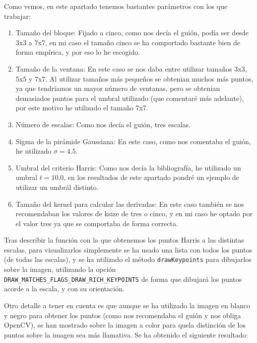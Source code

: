 \documentclass[12pt, spanish]{article}
\begin{document}
Como vemos, en este apartado tenemos bastantes parámetros con los que trabajar:

\begin{enumerate}
	\item Tamaño del bloque: Fijado a cinco, como nos decía el guión, podía ser desde 3x3 a 7x7, en mi caso el tamaño cinco se ha comportado bastante bien de forma empírica, y por eso lo he escogido.
	\item Tamaño de la ventana: En este caso se nos daba entre utilizar tamaños 3x3, 5x5 y 7x7. Al utilizar tamaños más pequeños se obtenian muchos más puntos, ya que tendríamos un mayor número de ventanas, pero se obtenian demasiados puntos para el umbral utilizado (que comentaré más adelante), por este motivo he utilizado el tamaño 7x7.
	\item Número de escalas: Como nos decía el guión, tres escalas.
	\item Sigma de la pirámide Gaussiana: En este caso, como nos comentaba el guión, he utilizado $\sigma = 4.5$.
	\item Umbral del criterio Harris: Como nos decía la bibliografía\cite{harris}, he utilizado un umbral $t = 10.0$, en los resultados de este apartado pondré un ejemplo de utilizar un umbrál distinto.
	\item Tamaño del kernel para calcular las derivadas: En este caso también se nos recomendaban los valores de ksize de tres o cinco, y en mi caso he optado por el valor tres ya que se comportaba de forma correcta.
\end{enumerate}

Tras describir la función con la que obtenemos los puntos Harris a las distintas escalas, para visualizarlos simplemente se ha usado una lista con todos los puntos (de todas las escalas), y se ha utilizado el método \texttt{drawKeypoints} para dibujarlos sobre la imagen, utilizando la opción\\  \texttt{DRAW\_MATCHES\_FLAGS\_DRAW\_RICH\_KEYPOINTS} de forma que dibujará los puntos acorde a la escala, y con su orientación.

Otro detalle a tener en cuenta es que aunque se ha utilizado la imagen en blanco y negro para obtener los puntos (como nos recomendaba el guión y nos obliga OpenCV), se han mostrado sobre la imagen a color para quela distinción de los puntos sobre la imagen sea más llamativa. Se ha obtenido el siguiente resultado:
\end{document}
